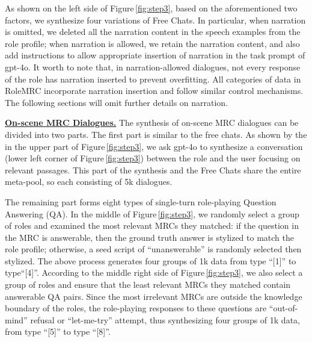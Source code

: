 As shown on the left side of Figure\,\ref{fig:step3}, based on the aforementioned two factors, we synthesize four variations of Free Chats. In particular, when  narration is omitted, we deleted all the 
narration content in the speech examples from the role profile; %
when narration is allowed, we retain the narration content, and also add instructions to allow appropriate insertion of narration in the task prompt of gpt-4o. It worth to note that, in narration-allowed dialogues, not every response of the role has narration inserted to prevent overfitting. All categories of data in RoleMRC incorporate narration insertion and follow similar control mechanisms. The following sections will omit further details on narration.

\noindent \textbf{\underline{On-scene MRC Dialogues.}} The synthesis of on-scene MRC dialogues can be divided into two parts. The first part is similar to the free chats. As shown by the {\color{lightgreen}{green round rectangle}} in the upper part of Figure\,\ref{fig:step3}, we ask gpt-4o to synthesize a conversation (lower left corner of Figure\,\ref{fig:step3}) between the role and the user focusing on relevant passages. This part of the synthesis and the Free Chats share the entire meta-pool, so each consisting of 5k dialogues.

The remaining part forms eight types of single-turn role-playing Question Answering (QA). In the middle of Figure\,\ref{fig:step3}, we randomly select a group of roles and examined the most relevant MRCs they matched: if the question in the MRC is answerable, then the ground truth answer is stylized to match the role profile; otherwise, a seed script of ``unanswerable'' is randomly selected then stylized. The above process generates four groups of 1k data from type ``[1]'' to type``[4]''. According to the middle right side of Figure\,\ref{fig:step3}, we also select a group of roles and ensure that the least relevant MRCs they matched contain answerable QA pairs. Since the most irrelevant MRCs are outside the knowledge boundary of the roles, the role-playing responses to these questions are ``out-of-mind'' refusal or ``let-me-try'' attempt, thus synthesizing four groups of 1k data, from type ``[5]'' to type ``[8]''.

